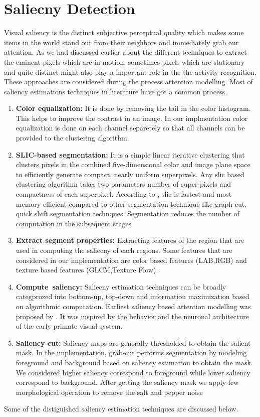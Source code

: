 \documentclass[MTech]{iitmdiss}
\begin{document}
\chapter{Saliecny Detection}
Visual saliency is the distinct subjective perceptual quality which makes some items in the world stand out from their neighbors and immediately grab our attention.
As we had discussed earlier about the different techniques to extract the eminent pixels which are in motion, sometimes pixels which are stationary and quite distinct might also play a important role in the the activity recognition. These approaches are considered during the process attention modelling. Most of saliency estimations techniques in literature have got a common process,
\begin{enumerate}
	\item{\textbf{Color equalization:} It is done by removing the tail in the color histogram. This helps to improve the contrast in an image. In our implmentation color equalization is done on each channel separetely so that all channels can be provided to the clustering algorithm.}
	\item{\textbf{SLIC-based segmentation:}  It is a simple linear iterative clustering that clusters pixels in the combined five-dimensional color and image plane space to efficiently generate compact, nearly uniform superpixels. Any slic based clustering algorithm takes two parameters number of super-pixels and compactness of each superpixel. According to \cite{slic}, slic is fastest and most memory efficient compared to  other segmentation technique like graph-cut, quick shift segmentation technques. Segmentation reduces the number of computation in the subsequent stages}
	\item{\textbf{Extract segment properties:} Extracting features of the region that are used in computing the saliecny of each regions. Some features that are considered in our implementation are color based features (LAB,RGB) and texture based features (GLCM,Texture Flow).}
	\item{\textbf{Compute~saliency:} Saliecny estimation techniques can be broadly categprozed into bottom-up, top-down and information maximization based on algorithmic computation. Earliest saliency based attention modelling was proposed by \cite{itti}. It was inspired by the behavior and the neuronal architecture of the early primate visual system.}
	\item{\textbf{Saliency cut:} Saliency maps are generally thresholded to obtain the salient mask. In the implementation, grab-cut\citep{grabcut} performs segmentation by modeling foreground and background based on saliency estimation to obtain the mask. We considered higher saliency  correspond to foreground while lower saliency correspond to background. After getting the saliency mask we apply few morphological operation to remove the salt and pepper noise}
\end{enumerate} 
\par Some of the distiguished saliency estimation techniques are discussed below. 
\end{document}
